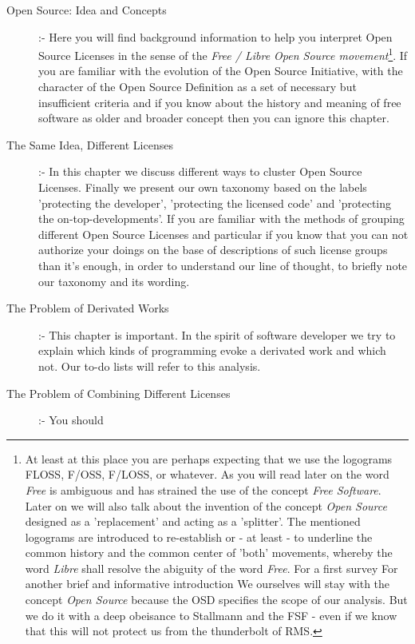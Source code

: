 \begin{description}
  \item[Open Source: Idea and Concepts] :- Here you will find background
  information to help you interpret Open Source Licenses in the sense of the
  \emph{Free / Libre Open Source movement}\footnote{At least at this place you
  are perhaps expecting that we use the logograms FLOSS, F/OSS, F/LOSS, or
  whatever. As you will read later on the word \textit{Free} is ambiguous and
  has strained the use of the concept \textit{Free Software}. Later on we will
  also talk about the invention of the concept \textit{Open Source} designed as
  a 'replacement' and acting as a 'splitter'. The mentioned logograms are
  introduced to re-establish or - at least - to underline the common history and
  the common center of 'both' movements, whereby the word \textit{Libre} shall
  resolve the abiguity of the word \textit{Free}. For a first survey
  \cite[cf.][\nopage wp.]{wpFloss2011a} For another brief and informative
  introduction \cite[cf.][231ff esp. p. 232f.]{Fogel2006a} We ourselves will
  stay with the concept \textit{Open Source} because the OSD specifies the scope
  of our analysis. But we do it with a deep obeisance to Stallmann and the FSF -
  even if we know that this will not protect us from the thunderbolt of RMS.}. If
  you are familiar with the evolution of the Open Source Initiative, with the
  character of the Open Source Definition as a set of necessary but insufficient
  criteria and if you know about the history and meaning of free software as
  older and broader concept then you can ignore this chapter.
  \item[The Same Idea, Different Licenses] :- In this chapter we discuss
  different ways to cluster Open Source Licenses. Finally we present our own
  taxonomy based on the labels 'protecting the developer', 'protecting the
  licensed code' and 'protecting the on-top-developments'. If you are familiar
  with the methods of grouping different Open Source Licenses and particular
  if you know that you can not authorize your doings on the base of descriptions
  of such license groups than it's enough, in order to understand our line of
  thought, to briefly note our taxonomy and its wording.
  \item[The Problem of Derivated Works] :- This chapter is important. In the
  spirit of software developer we try to explain which kinds of programming
  evoke a derivated work and which not. Our to-do lists will refer to this
  analysis.
  \item[The Problem of Combining Different Licenses] :- You should

\end{description}
